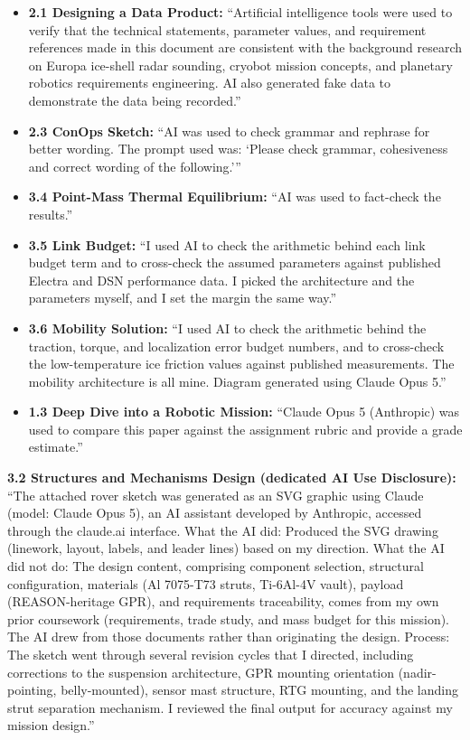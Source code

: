 \documentclass[11pt]{article}
\begin{document}
\begin{appendices}
\begin{itemize}[leftmargin=*]
    \item \textbf{2.1 Designing a Data Product:} ``Artificial intelligence tools were used to
    verify that the technical statements, parameter values, and requirement references made in
    this document are consistent with the background research on Europa ice-shell radar
    sounding, cryobot mission concepts, and planetary robotics requirements engineering. AI also
    generated fake data to demonstrate the data being recorded.''
    \item \textbf{2.3 ConOps Sketch:} ``AI was used to check grammar and rephrase for better
    wording. The prompt used was: `Please check grammar, cohesiveness and correct wording of
    the following.'''
    \item \textbf{3.4 Point-Mass Thermal Equilibrium:} ``AI was used to fact-check the results.''
    \item \textbf{3.5 Link Budget:} ``I used AI to check the arithmetic behind each link budget
    term and to cross-check the assumed parameters against published Electra and DSN performance
    data. I picked the architecture and the parameters myself, and I set the margin the same
    way.''
    \item \textbf{3.6 Mobility Solution:} ``I used AI to check the arithmetic behind the
    traction, torque, and localization error budget numbers, and to cross-check the
    low-temperature ice friction values against published measurements. The mobility
    architecture is all mine. Diagram generated using Claude Opus 5.''
    \item \textbf{1.3 Deep Dive into a Robotic Mission:} ``Claude Opus 5 (Anthropic) was used
    to compare this paper against the assignment rubric and provide a grade estimate.''
\end{itemize}

\textbf{3.2 Structures and Mechanisms Design (dedicated AI Use Disclosure):}
``The attached rover sketch was generated as an SVG graphic using Claude (model: Claude Opus 5),
an AI assistant developed by Anthropic, accessed through the claude.ai interface. What the AI
did: Produced the SVG drawing (linework, layout, labels, and leader lines) based on my direction.
What the AI did not do: The design content, comprising component selection, structural
configuration, materials (Al 7075-T73 struts, Ti-6Al-4V vault), payload (REASON-heritage GPR),
and requirements traceability, comes from my own prior coursework (requirements, trade study, and mass budget
for this mission). The AI drew from those documents rather than originating the design. Process:
The sketch went through several revision cycles that I directed, including corrections to the
suspension architecture, GPR mounting orientation (nadir-pointing, belly-mounted), sensor mast
structure, RTG mounting, and the landing strut separation mechanism. I reviewed the final output
for accuracy against my mission design.''

\end{appendices}
\end{document}
